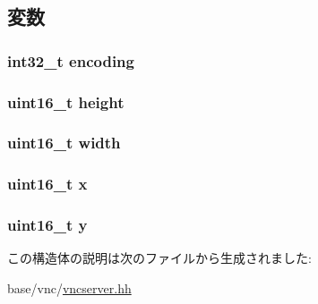 \subsection{変数}
\hypertarget{structVncServer_1_1FrameBufferRect_a18a7b605a2e8450803090da92cf2c034}{
\subsubsection[{encoding}]{\setlength{\rightskip}{0pt plus 5cm}int32\_\-t {\bf encoding}}}
\label{structVncServer_1_1FrameBufferRect_a18a7b605a2e8450803090da92cf2c034}
\hypertarget{structVncServer_1_1FrameBufferRect_a81c9f8d0b8c3b49d770be14dbe9f0d37}{
\subsubsection[{height}]{\setlength{\rightskip}{0pt plus 5cm}uint16\_\-t {\bf height}}}
\label{structVncServer_1_1FrameBufferRect_a81c9f8d0b8c3b49d770be14dbe9f0d37}
\hypertarget{structVncServer_1_1FrameBufferRect_ad0eab1042455a2067c812ab8071d5376}{
\subsubsection[{width}]{\setlength{\rightskip}{0pt plus 5cm}uint16\_\-t {\bf width}}}
\label{structVncServer_1_1FrameBufferRect_ad0eab1042455a2067c812ab8071d5376}
\hypertarget{structVncServer_1_1FrameBufferRect_a4dde988b1b2adba65ae3efa69f65d960}{
\subsubsection[{x}]{\setlength{\rightskip}{0pt plus 5cm}uint16\_\-t {\bf x}}}
\label{structVncServer_1_1FrameBufferRect_a4dde988b1b2adba65ae3efa69f65d960}
\hypertarget{structVncServer_1_1FrameBufferRect_ab0580f504a7428539be299fa71565f30}{
\subsubsection[{y}]{\setlength{\rightskip}{0pt plus 5cm}uint16\_\-t {\bf y}}}
\label{structVncServer_1_1FrameBufferRect_ab0580f504a7428539be299fa71565f30}


この構造体の説明は次のファイルから生成されました:\begin{DoxyCompactItemize}
\item 
base/vnc/\hyperlink{vncserver_8hh}{vncserver.hh}\end{DoxyCompactItemize}
